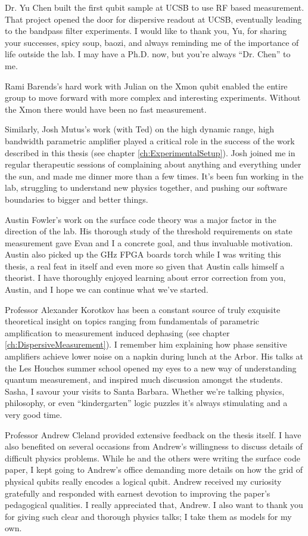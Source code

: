 \begin{acknowledgements}
Dr. Yu Chen built the first qubit sample at UCSB to use RF based measurement.
That project opened the door for dispersive readout at UCSB, eventually leading to the bandpass filter experiments.
I would like to thank you, Yu, for sharing your successes, spicy soup, baozi, and always reminding me of the importance of life outside the lab.
I may have a Ph.D. now, but you're always ``Dr. Chen'' to me.

Rami Barends's hard work with Julian on the Xmon qubit enabled the entire group to move forward with more complex and interesting experiments.
Without the Xmon there would have been no fast measurement.

Similarly, Josh Mutus's work (with Ted) on the high dynamic range, high bandwidth parametric amplifier played a critical role in the success of the work described in this thesis (see chapter \ref{ch:ExperimentalSetup}).
Josh joined me in regular therapeutic sessions of complaining about anything and everything under the sun, and made me dinner more than a few times.
It's been fun working in the lab, struggling to understand new physics together, and pushing our software boundaries to bigger and better things.

Austin Fowler's work on the surface code theory was a major factor in the direction of the lab.
His thorough study of the threshold requirements on state measurement gave Evan and I a concrete goal, and thus invaluable motivation.
Austin also picked up the GHz FPGA boards torch while I was writing this thesis, a real feat in itself and even more so given that Austin calls himself a theorist.
I have thoroughly enjoyed learning about error correction from you, Austin, and I hope we can continue what we've started.

Professor Alexander Korotkov has been a constant source of truly exquisite theoretical insight on topics ranging from fundamentals of parametric amplification to measurement induced dephasing (see chapter \ref{ch:DispersiveMeasurement}).
I remember him explaining how phase sensitive amplifiers achieve lower noise on a napkin during lunch at the Arbor.
His talks at the Les Houches summer school opened my eyes to a new way of understanding quantum measurement, and inspired much discussion amongst the students.
Sasha, I savour your visits to Santa Barbara.
Whether we're talking physics, philosophy, or even ``kindergarten'' logic puzzles it's always stimulating and a very good time.

Professor Andrew Cleland provided extensive feedback on the thesis itself.
I have also benefited on several occasions from Andrew's willingness to discuss details of difficult physics problems.
While he and the others were writing the surface code paper, I kept going to Andrew's office demanding more details on how the grid of physical qubits really encodes a logical qubit.
Andrew received my curiosity gratefully and responded with earnest devotion to improving the paper's pedagogical qualities.
I really appreciated that, Andrew.
I also want to thank you for giving such clear and thorough physics talks; I take them as models for my own.


\end{acknowledgements}
